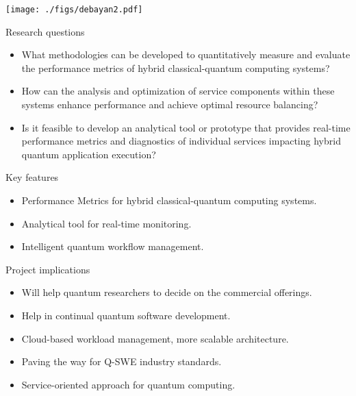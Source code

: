 \documentclass[landscape,a0,final]{a0poster} %
\begin{document}
\begin{minipage}{0.98\linewidth}
\begin{minipage}[t]{0.3\linewidth}
\begin{center}
\texttt{[image: ./figs/debayan2.pdf]}
\end{center}

\begin{myframe}{Research questions}
    \begin{itemize}
    \item What methodologies can be developed to quantitatively measure and evaluate the performance metrics of hybrid classical-quantum computing systems?
    \item How can the analysis and optimization of service components within these systems enhance performance and achieve optimal resource balancing?
    \item Is it feasible to develop an analytical tool or prototype that provides real-time performance metrics and diagnostics of individual services impacting hybrid quantum application execution?
    \end{itemize}
 
\end{myframe}

\begin{myframe}{Key features}
    \begin{itemize}
        \item Performance Metrics for hybrid classical-quantum computing systems.
        \item Analytical tool for real-time monitoring.
        \item Intelligent quantum workflow management.
    \end{itemize}


\end{myframe}

\begin{myframe}{Project implications}
    \begin{itemize}
        \item Will help quantum researchers to decide on the commercial offerings.
        \item Help in continual quantum software development.
        \item Cloud-based workload management, more scalable architecture.
        \item Paving the way for Q-SWE industry standards.
        \item Service-oriented approach for quantum computing.
        
    \end{itemize}



\end{myframe}
\end{minipage}
\end{minipage}
\end{document}
